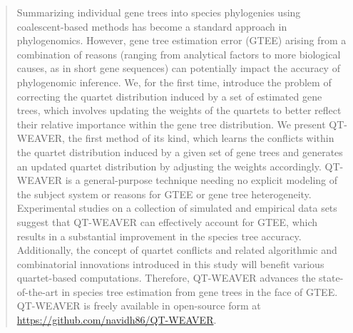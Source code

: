 \documentclass[runningheads]{llncs}
\begin{document}
\begin{abstract}
Summarizing individual gene trees into species phylogenies using coalescent-based methods has become a standard approach in phylogenomics. 
However, gene tree estimation error (GTEE) arising from a combination of reasons (ranging from analytical factors to more biological causes, as in short gene sequences) can potentially impact the accuracy of phylogenomic inference.
We, for the first time, introduce the problem of correcting the quartet distribution induced by a set of estimated gene trees, which involves updating the weights of the quartets to better reflect their relative importance within the gene tree distribution. We present QT-WEAVER, the first method of its kind, which learns the conflicts within the quartet distribution induced by a given set of gene trees and generates an updated quartet distribution by adjusting the weights accordingly. QT-WEAVER is a general-purpose technique needing no explicit modeling of the subject system or reasons for GTEE or gene tree heterogeneity. Experimental studies on a collection of simulated and empirical data sets suggest that QT-WEAVER can effectively account for GTEE, which results in a substantial improvement in the species tree accuracy. Additionally, the concept of quartet conflicts and related algorithmic and combinatorial innovations introduced in this study will benefit various quartet-based computations. Therefore, QT-WEAVER advances the state-of-the-art in species tree estimation from gene trees in the face of GTEE. QT-WEAVER is freely available in open-source form at \url{https://github.com/navidh86/QT-WEAVER}.






\end{abstract}
\end{document}
